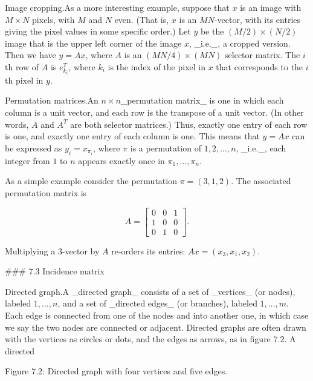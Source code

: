 
Image cropping.As a more interesting example, suppose that \(x\) is an image with \(M\times N\) pixels, with \(M\) and \(N\) even. (That is, \(x\) is an \(MN\)-vector, with its entries giving the pixel values in some specific order.) Let \(y\) be the \((M/2)\times(N/2)\) image that is the upper left corner of the image \(x\), _i.e._, a cropped version. Then we have \(y=Ax\), where \(A\) is an \((MN/4)\times(MN)\) selector matrix. The \(i\)th row of \(A\) is \(e_{k_{i}}^{T}\), where \(k_{i}\) is the index of the pixel in \(x\) that corresponds to the \(i\)th pixel in \(y\).

Permutation matrices.An \(n\times n\)_permutation matrix_ is one in which each column is a unit vector, and each row is the transpose of a unit vector. (In other words, \(A\) and \(A^{T}\) are both selector matrices.) Thus, exactly one entry of each row is one, and exactly one entry of each column is one. This means that \(y=Ax\) can be expressed as \(y_{i}=x_{\pi_{i}}\), where \(\pi\) is a permutation of \(1,2,\ldots,n\), _i.e._, each integer from \(1\) to \(n\) appears exactly once in \(\pi_{1},\ldots,\pi_{n}\).

As a simple example consider the permutation \(\pi=(3,1,2)\). The associated permutation matrix is

\[A=\left[\begin{array}{ccc}0&0&1\\ 1&0&0\\ 0&1&0\end{array}\right].\]

Multiplying a 3-vector by \(A\) re-orders its entries: \(Ax=(x_{3},x_{1},x_{2})\).

### 7.3 Incidence matrix

Directed graph.A _directed graph_ consists of a set of _vertices_ (or nodes), labeled \(1,\ldots,n\), and a set of _directed edges_ (or branches), labeled \(1,\ldots,m\). Each edge is connected from one of the nodes and into another one, in which case we say the two nodes are connected or adjacent. Directed graphs are often drawn with the vertices as circles or dots, and the edges as arrows, as in figure 7.2. A directed

Figure 7.2: Directed graph with four vertices and five edges.

 